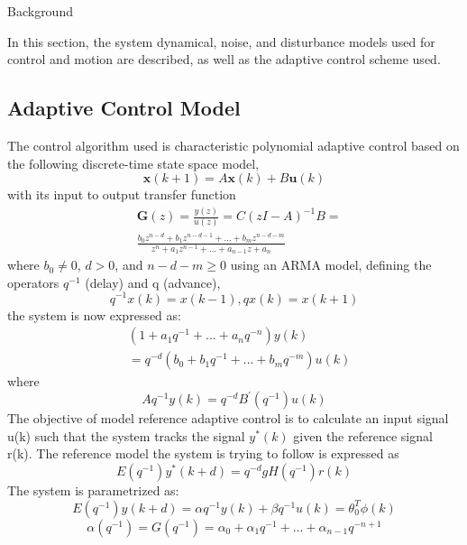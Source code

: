 \begin{section}{Background}
	
\label{sec:model}
In this section, the system dynamical, noise, and disturbance models used for control and motion are described, as well as the adaptive control scheme used.

\subsection{Adaptive Control Model}
The control algorithm used is characteristic polynomial adaptive control based on the following discrete-time state space model,
	\begin{equation}
	\bm{x}(k+1) = A\bm{x}(k) + B\bm{u}(k)
	\end{equation}
with its input to output transfer function 
	\begin{align}
	& \bm{G}(z) = \frac{y(z)}{u(z)} = C(zI-A)^{-1}B = \nonumber \\ 
	& \frac{b_0z^{n-d}+b_1z^{n-d-1}+...+b_mz^{n-d-m}}{z^{n}+a_1z^{n-1}+...+a_{n-1}z+a_n}
	\end{align}
where $b_0\ne{0}$, $d>0$, and $n-d-m\geq{0}$
using an ARMA model, defining the operators $q^{-1}$ (delay) and q (advance),
	\begin{equation}
	q^{-1}x(k) = x(k-1), qx(k) = x(k+1)
	\end{equation}
the system is now expressed as:
	\begin{align}
	& (1+a_1q^{-1}+...+a_nq^{-n})y(k) \nonumber \\
	& =q^{-d}(b_0+b_1q^{-1}+...+b_mq^{-m})u(k)
	\end{align}
where
	\begin{equation}
	Aq^{-1}y(k)=q^{-d}B^{'}(q^{-1})u(k)
	\end{equation}
The objective of model reference adaptive control is to calculate an input signal u(k) such that the system tracks the signal $y^{*}(k)$ given the reference signal r(k). The reference model the system is trying to follow is expressed as
	\begin{equation}
	E(q^{-1})y^*(k+d)=q^{-d}gH(q^{-1})r(k)
	\end{equation}
The system is parametrized as:
	\begin{equation}
	E(q^{-1})y(k+d)={\alpha}q^{-1}y(k) + {\beta}q^{-1}u(k)=\theta_0^T\phi(k)
	\end{equation}
	\begin{equation}
	\alpha(q^{-1})=G(q^{-1})=\alpha_0+\alpha_1q^{-1}+ ... +\alpha_{n-1}q^{-n+1}
	\end{equation}

\end{section}

